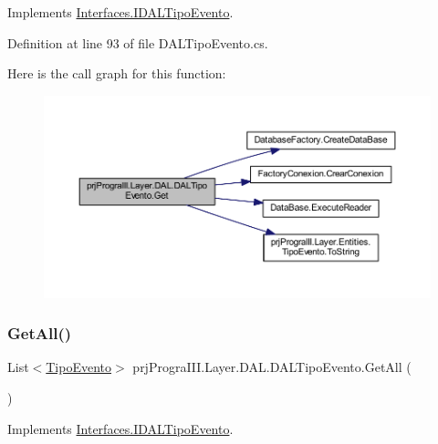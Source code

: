 Implements \hyperlink{interface_interfaces_1_1_i_d_a_l_tipo_evento_a28e0e3a7b6e9c4f4a04b787905d7270e}{Interfaces.\+I\+D\+A\+L\+Tipo\+Evento}.



Definition at line 93 of file D\+A\+L\+Tipo\+Evento.\+cs.

Here is the call graph for this function\+:
\nopagebreak
\begin{figure}[H]
\begin{center}
\leavevmode
\includegraphics[width=350pt]{classprj_progra_i_i_i_1_1_layer_1_1_d_a_l_1_1_d_a_l_tipo_evento_a43ec574ca3071e7b497613178a67a0fe_cgraph}
\end{center}
\end{figure}
\hypertarget{classprj_progra_i_i_i_1_1_layer_1_1_d_a_l_1_1_d_a_l_tipo_evento_afc72a91b1a8484b317932a6f01c42815}{}\label{classprj_progra_i_i_i_1_1_layer_1_1_d_a_l_1_1_d_a_l_tipo_evento_afc72a91b1a8484b317932a6f01c42815} 
\subsubsection{\texorpdfstring{Get\+All()}{GetAll()}}
{\footnotesize\ttfamily List$<$\hyperlink{classprj_progra_i_i_i_1_1_layer_1_1_entities_1_1_tipo_evento}{Tipo\+Evento}$>$ prj\+Progra\+I\+I\+I.\+Layer.\+D\+A\+L.\+D\+A\+L\+Tipo\+Evento.\+Get\+All (\begin{DoxyParamCaption}{ }\end{DoxyParamCaption})}



Implements \hyperlink{interface_interfaces_1_1_i_d_a_l_tipo_evento_a8e2c880d0b06a4ed517fddda2fba826b}{Interfaces.\+I\+D\+A\+L\+Tipo\+Evento}.



